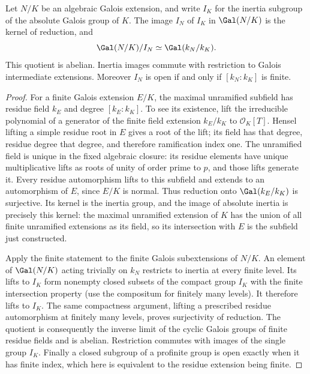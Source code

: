 \begin{lemma}
\label{ft:inertia-residue}\notready
{}
Let $N/K$ be an algebraic Galois extension, and write $I_K$ for the
inertia subgroup of the absolute Galois group of $K$. The image $I_N$
of $I_K$ in $\Gal(N/K)$ is the kernel of reduction, and
\[
 \Gal(N/K)/I_N\simeq\Gal(k_N/k_K).
\]
This quotient is abelian. Inertia images commute with restriction to
Galois intermediate extensions. Moreover $I_N$ is open if and only if
$[k_N:k_K]$ is finite.
\end{lemma}
\begin{proof}
For a finite Galois extension $E/K$, the maximal unramified subfield
has residue field $k_E$ and degree $[k_E:k_K]$. To see its existence,
lift the irreducible polynomial of a generator of the finite field
extension $k_E/k_K$ to $\mathcal O_K[T]$. Hensel lifting a simple
residue root in $E$ gives a root of the lift; its field has that degree,
residue degree that degree, and therefore ramification index one.
The unramified field is unique in the fixed algebraic closure: its
residue elements have unique multiplicative lifts as roots of unity
of order prime to $p$, and those lifts generate it.
Every residue automorphism lifts to this subfield and extends to an
automorphism of $E$, since $E/K$ is normal. Thus reduction onto
$\Gal(k_E/k_K)$ is surjective. Its kernel is the inertia group, and
the image of absolute inertia is precisely this kernel: the maximal
unramified extension of $K$ has the union of all finite unramified
extensions as its field, so its intersection with $E$ is the subfield
just constructed.

Apply the finite statement to the finite Galois subextensions of $N/K$.
An element of $\Gal(N/K)$ acting trivially on $k_N$ restricts to inertia
at every finite level. Its lifts to $I_K$ form nonempty closed subsets
of the compact group $I_K$ with the finite intersection property
(use the compositum for finitely many levels). It therefore lifts to
$I_K$. The same compactness argument, lifting a prescribed residue
automorphism at finitely many levels, proves surjectivity of reduction.
The quotient is consequently the inverse limit of the cyclic Galois
groups of finite residue fields and is abelian. Restriction commutes
with images of the single group $I_K$. Finally a closed subgroup of a
profinite group is open exactly when it has finite index, which here
is equivalent to the residue extension being finite.
\end{proof}

